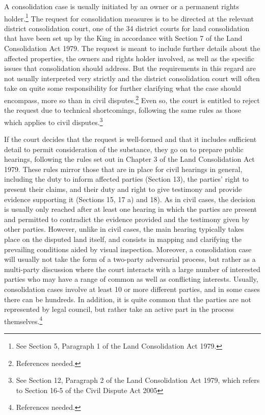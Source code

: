 A consolidation case is usually initiated by an owner or a permanent rights holder.\footnote{See Section 5, Paragraph 1 of the Land Consolidation Act 1979.} The request for consolidation measures is to be directed at the relevant district consolidation court, one of the 34 district courts for land consolidation that have been set up by the King in accordance with Section 7 of the Land Consolidation Act 1979. The request is meant to include further details about the affected properties, the owners and rights holder involved, as well as the specific issues that consolidation should address. But the requirements in this regard are not usually interpreted very strictly and the district consolidation court will often take on quite some responsibility for further clarifying what the case should encompass, more so than in civil disputes.\footnote{References needed.} Even so, the court is entitled to reject the request due to technical shortcomings, following the same rules as those which applies to civil disputes.\footnote{See Section 12, Paragraph 2 of the Land Consolidation Act 1979, which refers to Section 16-5 of the Civil Dispute Act 2005}

If the court decides that the request is well-formed and that it includes sufficient detail to permit consideration of the substance, they go on to prepare public hearings, following the rules set out in Chapter 3 of the Land Consolidation Act 1979. These rules mirror those that are in place for civil hearings in general, including the duty to inform affected parties (Section 13), the parties' right to present their claims, and their duty and right to give testimony and provide evidence supporting it (Sections 15, 17 a) and 18). As in civil cases, the decision is usually only reached after at least one hearing in which the parties are present and permitted to contradict the evidence provided and the testimony given by other parties. However, unlike in civil cases, the main hearing typically takes place on the disputed land itself, and consists in mapping and clarifying the prevailing conditions aided by visual inspection. Moreover, a consolidation case will usually not take the form of a two-party adversarial process, but rather as a multi-party discussion where the court interacts with a large number of interested parties who may have a range of common as well as conflicting interests. Usually, consolidation cases involve at least 10 or more different parties, and in some cases there can be hundreds. In addition, it is quite common that the parties are not represented by legal council, but rather take an active part in the process themselves.\footnote{References needed.}

